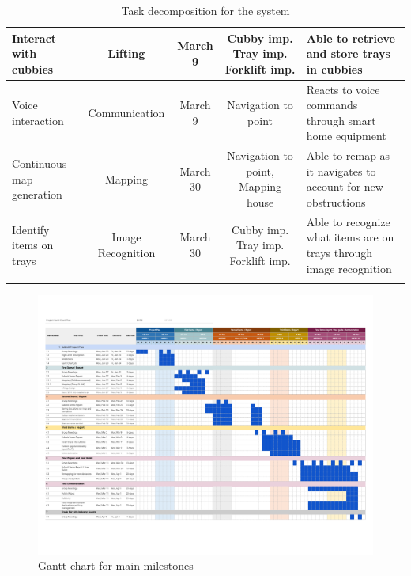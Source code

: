 \documentclass{article}
\begin{document}
\begin{table}[h]
\begin{center}
\begin{small}
\begin{sc}
\begin{tabular}{lcccp{3cm}}
Interact with cubbies & Lifting & March 9 & Cubby imp. Tray imp. Forklift imp. & Able to retrieve and store trays in cubbies \\ \hline
Voice interaction & Communication & March 9 & Navigation to point & Reacts to voice commands through smart home equipment \\ \hline
Continuous map generation & Mapping & March 30 & Navigation to point, Mapping house & Able to remap as it navigates to account for new obstructions \\ \hline
Identify items on trays & Image Recognition & March 30 & Cubby imp. Tray imp. Forklift imp. & Able to recognize what items are on trays through image recognition \\ \hline
\belowspace
\end{tabular}
\end{sc}
\end{small}
\caption{Task decomposition for the system}
\label{tab:sample-table}
\end{center}
\vskip -3mm
\end{table}

\begin{figure}
\vskip 3mm
\begin{center}
\begin{small}
\begin{sc}
\centerline{\includegraphics[width=\paperwidth]{figs/Gantt.pdf}}
\caption{Gantt chart for main milestones}
\label{Gantt Chart}
\end{sc}
\end{small}
\end{center}
\vskip -3mm
\end{figure} 
\end{document}
